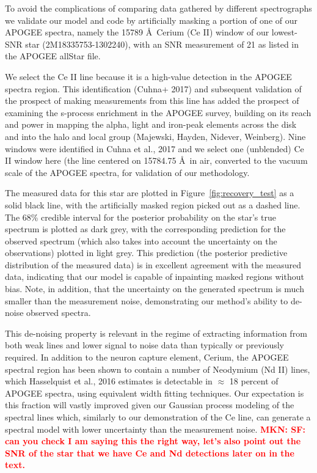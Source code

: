 \documentclass[a4paper,fleqn,usenatbib]{mnras}
\newcommand{\mkn}[1]{\textbf{\textcolor{red}{MKN: #1}}}
\begin{document}
To avoid the complications of comparing data gathered by different spectrographs we validate our model and code by artificially masking a portion of one of our APOGEE spectra, namely the 15789 \AA\ Cerium (Ce II) window of our lowest-SNR star (2M18335753-1302240), with an SNR measurement of 21 as listed in the APOGEE allStar file. 


We select the Ce II line because it is a high-value detection in the APOGEE spectra region. This identification (Cuhna+ 2017) and subsequent validation of the prospect of making measurements from this line has added the prospect of examining the s-process enrichment in the APOGEE survey, building on its reach and power in mapping the alpha, light and iron-peak elements across the disk and into the halo and local group (Majewski, Hayden, Nidever, Weinberg). Nine windows were identified in Cuhna et al., 2017 and we select one (unblended) Ce II window here (the line centered on 15784.75 \AA\ in air, converted to the vacuum scale of the APOGEE spectra, for validation of our methodology. 


The measured data for this star are plotted in Figure~\ref{fig:recovery_test} as a solid black line, with the artificially masked region picked out as a dashed line. The 68\% credible interval for the posterior probability on the star's true spectrum is plotted as dark grey, with the corresponding prediction for the observed spectrum (which also takes into account the uncertainty on the observations) plotted in light grey. This prediction (the posterior predictive distribution of the measured data) is in excellent agreement with the measured data, indicating that our model is capable of inpainting masked regions without bias. Note, in addition, that the uncertainty on the generated spectrum is much smaller than the measurement noise, demonstrating our method's ability to de-noise observed spectra.

This de-noising property is relevant in the regime of extracting information from both weak lines and lower signal to noise data than typically or previously required. In addition to the neuron capture element, Cerium, the APOGEE spectral region has been shown to contain a number of Neodymium (Nd II) lines, which Hasselquist et al., 2016 estimates is detectable in $\approx$ 18 percent of APOGEE spectra, using equivalent width fitting techniques. Our expectation is this fraction will vastly improved given our Gaussian process modeling of the spectral lines which, similarly to our demonstration of the Ce line, can generate a spectral model with lower uncertainty than the measurement noise. \mkn{SF: can you check I am saying this the right way, let's also point out the SNR of the star that we have Ce and Nd detections later on in the text.}
\end{document}
